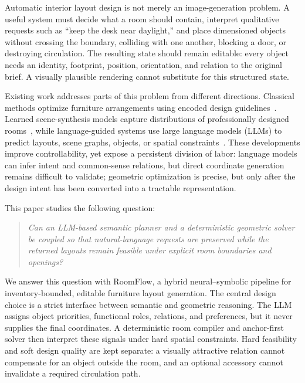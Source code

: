 \documentclass[pdflatex,sn-mathphys-num]{sn-jnl}
\newcommand{\method}{RoomFlow}
\begin{document}
Automatic interior layout design is not merely an image-generation problem. A useful system must decide what a room should contain, interpret qualitative requests such as ``keep the desk near daylight,'' and place dimensioned objects without crossing the boundary, colliding with one another, blocking a door, or destroying circulation. The resulting state should remain editable: every object needs an identity, footprint, position, orientation, and relation to the original brief. A visually plausible rendering cannot substitute for this structured state.

Existing work addresses parts of this problem from different directions. Classical methods optimize furniture arrangements using encoded design guidelines~\cite{merrell2011interactive,yu2011make}. Learned scene-synthesis models capture distributions of professionally designed rooms~\cite{fu20213dfront,paschalidou2021atiss,tang2024diffuscene}, while language-guided systems use large language models (LLMs) to predict layouts, scene graphs, objects, or spatial constraints~\cite{feng2023layoutgpt,celen2024idesign,yang2024holodeck,lin2024instructscene,yang2024llplace,littlefair2025flairgpt}. These developments improve controllability, yet expose a persistent division of labor: language models can infer intent and common-sense relations, but direct coordinate generation remains difficult to validate; geometric optimization is precise, but only after the design intent has been converted into a tractable representation.

This paper studies the following question:

\begin{quote}
\emph{Can an LLM-based semantic planner and a deterministic geometric solver be coupled so that natural-language requests are preserved while the returned layouts remain feasible under explicit room boundaries and openings?}
\end{quote}

We answer this question with \method, a hybrid neural--symbolic pipeline for inventory-bounded, editable furniture layout generation. The central design choice is a strict interface between semantic and geometric reasoning. The LLM assigns object priorities, functional roles, relations, and preferences, but it never supplies the final coordinates. A deterministic room compiler and anchor-first solver then interpret these signals under hard spatial constraints. Hard feasibility and soft design quality are kept separate: a visually attractive relation cannot compensate for an object outside the room, and an optional accessory cannot invalidate a required circulation path.
\end{document}
